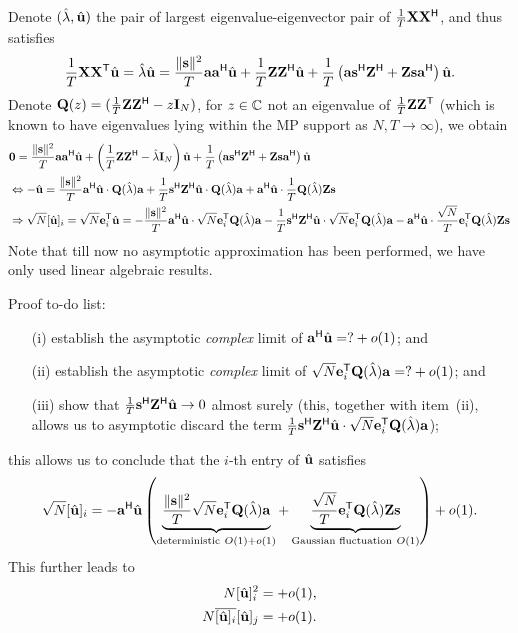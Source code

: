 \documentclass[11pt,a4paper]{article}
\begin{document}
Denote $(\hat \lambda, \hat {\mathbf{u}})$ the pair of largest eigenvalue-eigenvector pair of $\frac1T {\mathbf{X}} {\mathbf{X}}^{\sf H}$, and thus satisfies
\begin{equation}
	\frac1T {\mathbf{X}} {\mathbf{X}}^{\sf T} \hat {\mathbf{u}} = \hat \lambda \hat {\mathbf{u}} = \frac{ \| \mathbf{s} \|^2 }T \mathbf{a} \mathbf{a}^{\sf H} \hat {\mathbf{u}} + \frac1T {\mathbf{Z}} {\mathbf{Z}}^{\sf H} \hat {\mathbf{u}} + \frac1T \left( \mathbf{a} \mathbf{s}^{\sf H} {\mathbf{Z}}^{\sf H} + {\mathbf{Z}} \mathbf{s} \mathbf{a}^{\sf H} \right) \hat {\mathbf{u}}.
\end{equation}
Denote ${\mathbf{Q}}(z) = (\frac1T {\mathbf{Z}} {\mathbf{Z}}^{\sf H} - z \mathbf{I}_N)$, for $z \in {\mathbb{C}}$ not an eigenvalue of $\frac1T {\mathbf{Z}} {\mathbf{Z}}^{\sf T}$ (which is known to have eigenvalues lying within the MP support as $N,T \to \infty$), we obtain
\begin{align*}
	&\mathbf{0} = \frac{ \| \mathbf{s} \|^2 }T \mathbf{a} \mathbf{a}^{\sf H} \hat {\mathbf{u}} + \left( \frac1T {\mathbf{Z}} {\mathbf{Z}}^{\sf H} - \hat \lambda \mathbf{I}_N \right) \hat {\mathbf{u}} + \frac1T \left( \mathbf{a} \mathbf{s}^{\sf H} {\mathbf{Z}}^{\sf H} + {\mathbf{Z}} \mathbf{s} \mathbf{a}^{\sf H} \right) \hat {\mathbf{u}} \\ 
	&\Leftrightarrow - \hat {\mathbf{u}} = \frac{ \| \mathbf{s} \|^2 }T \mathbf{a}^{\sf H} \hat {\mathbf{u}} \cdot {\mathbf{Q}}(\hat \lambda) \mathbf{a} + \frac1T \mathbf{s}^{\sf H} {\mathbf{Z}}^{\sf H} \hat {\mathbf{u}} \cdot {\mathbf{Q}}(\hat \lambda) \mathbf{a} + \mathbf{a}^{\sf H} \hat {\mathbf{u}} \cdot \frac1T {\mathbf{Q}}(\hat \lambda) {\mathbf{Z}} \mathbf{s} \\ 
	&\Rightarrow \sqrt N [\hat {\mathbf{u}}]_i  = \sqrt N \mathbf{e}_i^{\sf T} \hat {\mathbf{u}} = -\frac{ \| \mathbf{s} \|^2 }T \mathbf{a}^{\sf H} \hat {\mathbf{u}} \cdot \sqrt N \mathbf{e}_i^{\sf T} {\mathbf{Q}}(\hat \lambda) \mathbf{a} - \frac1T \mathbf{s}^{\sf H} {\mathbf{Z}}^{\sf H} \hat {\mathbf{u}} \cdot \sqrt N \mathbf{e}_i^{\sf T} {\mathbf{Q}}(\hat \lambda) \mathbf{a} - \mathbf{a}^{\sf H} \hat {\mathbf{u}} \cdot  \frac{\sqrt N}T \mathbf{e}_i^{\sf T} {\mathbf{Q}}(\hat \lambda) {\mathbf{Z}} \mathbf{s}
\end{align*}
Note that till now no asymptotic approximation has been performed, we have only used linear algebraic results.

Proof to-do list:
\begin{itemize}
	\item[(i)] establish the asymptotic \emph{complex} limit of $\mathbf{a}^{\sf H} \hat {\mathbf{u}} = ? + o(1)$; and 
	\item[(ii)] establish the asymptotic \emph{complex} limit of $\sqrt N \mathbf{e}_i^{\sf T} {\mathbf{Q}}(\hat \lambda) \mathbf{a} = ? + o(1)$; and 
	\item[(iii)] show that $\frac1T \mathbf{s}^{\sf H} {\mathbf{Z}}^{\sf H} \hat {\mathbf{u}} \to 0$ almost surely (this, together with item~(ii), allows us to asymptotic discard the term $\frac1T \mathbf{s}^{\sf H} {\mathbf{Z}}^{\sf H} \hat {\mathbf{u}} \cdot \sqrt N \mathbf{e}_i^{\sf T} {\mathbf{Q}}(\hat \lambda) \mathbf{a}$);
\end{itemize}
this allows us to conclude that the $i$-th entry of $\hat {\mathbf{u}}$ satisfies
\begin{equation}
	\sqrt N [\hat {\mathbf{u}}]_i  = - \mathbf{a}^{\sf H} \hat {\mathbf{u}} \left( \underbrace{\frac{ \| \mathbf{s} \|^2 }T \sqrt N \mathbf{e}_i^{\sf T} {\mathbf{Q}}(\hat \lambda) \mathbf{a}}_{ \text{deterministic}~O(1) + o(1) } + \underbrace{\frac{\sqrt N}T \mathbf{e}_i^{\sf T} {\mathbf{Q}}(\hat \lambda) {\mathbf{Z}} \mathbf{s}}_{ \text{Gaussian fluctuation}~O(1) } \right) + o(1).
\end{equation}
This further leads to
\begin{align*}
		N [\hat {\mathbf{u}}]_i^2 =  + o(1), \\ 
		N \overline{[\hat{\mathbf{u}}]_i} [\hat {\mathbf{u}}]_j =  + o(1).
\end{align*}
\end{document}
